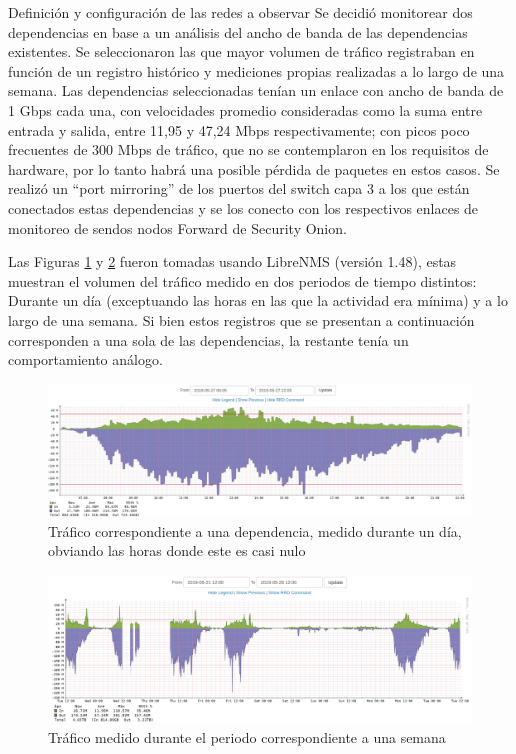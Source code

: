     \begin{subsection}{Definición y configuración de las redes a observar}
        Se decidió monitorear dos dependencias en base a un análisis del ancho de banda de las dependencias existentes. Se seleccionaron las que mayor volumen de tráfico registraban en función de un registro histórico y mediciones propias realizadas a lo largo de una semana. Las dependencias seleccionadas tenían un enlace con ancho de banda de 1 Gbps cada una, con  velocidades promedio consideradas como la suma entre entrada y salida, entre 11,95 y 47,24 Mbps respectivamente; con picos poco frecuentes de 300 Mbps de tráfico, que no se contemplaron en los requisitos de hardware, por lo tanto habrá una posible pérdida de paquetes en estos casos. Se realizó un “port mirroring” de los puertos del switch capa 3 a los que están conectados estas dependencias y se los conecto con los respectivos enlaces de monitoreo de sendos nodos Forward de Security Onion.\par
        Las Figuras \ref{fig:figura_35_trafico_dia} y \ref{fig:figura_36_trafico_semana} fueron tomadas usando LibreNMS \cite{librenms} (versión 1.48),  estas muestran el volumen del tráfico medido en dos periodos de tiempo distintos: Durante un día (exceptuando las horas en las que la actividad era mínima) y a lo largo de una semana. Si bien estos registros que se presentan a continuación corresponden a una sola de las dependencias, la restante tenía un comportamiento análogo.\par
        \begin{figure}[H]
        \centering
            \includegraphics[width=1\textwidth]{./iteracion_1_imagenes/figura_35_trafico_dia.png}
            \caption{Tráfico correspondiente a una dependencia, medido durante un día, obviando las horas donde este es casi nulo}
            \label{fig:figura_35_trafico_dia}
        \end{figure}
        \begin{figure}[H]
        \centering
            \includegraphics[width=1\textwidth]{./iteracion_1_imagenes/figura_36_trafico_semana.png}
            \caption{Tráfico medido durante el periodo correspondiente a una semana}
            \label{fig:figura_36_trafico_semana}
        \end{figure}
        \FloatBarrier
        \end{subsection}

